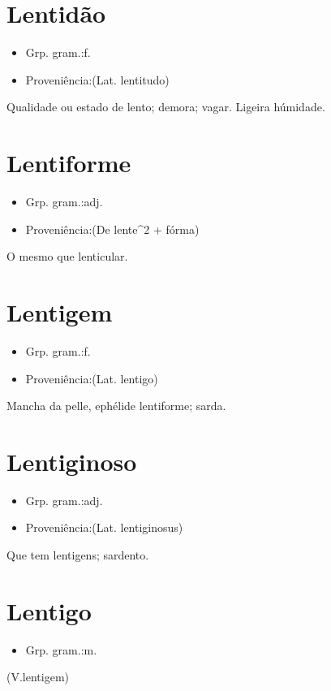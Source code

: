 \section{Lentidão}
\begin{itemize}
\item {Grp. gram.:f.}
\end{itemize}
\begin{itemize}
\item {Proveniência:(Lat. \textunderscore lentitudo\textunderscore )}
\end{itemize}
Qualidade ou estado de lento; demora; vagar.
Ligeira húmidade.
\section{Lentiforme}
\begin{itemize}
\item {Grp. gram.:adj.}
\end{itemize}
\begin{itemize}
\item {Proveniência:(De \textunderscore lente\textunderscore ^2 + \textunderscore fórma\textunderscore )}
\end{itemize}
O mesmo que \textunderscore lenticular\textunderscore .
\section{Lentigem}
\begin{itemize}
\item {Grp. gram.:f.}
\end{itemize}
\begin{itemize}
\item {Proveniência:(Lat. \textunderscore lentigo\textunderscore )}
\end{itemize}
Mancha da pelle, ephélide lentiforme; sarda.
\section{Lentiginoso}
\begin{itemize}
\item {Grp. gram.:adj.}
\end{itemize}
\begin{itemize}
\item {Proveniência:(Lat. \textunderscore lentiginosus\textunderscore )}
\end{itemize}
Que tem lentigens; sardento.
\section{Lentigo}
\begin{itemize}
\item {Grp. gram.:m.}
\end{itemize}
(V.lentigem)
